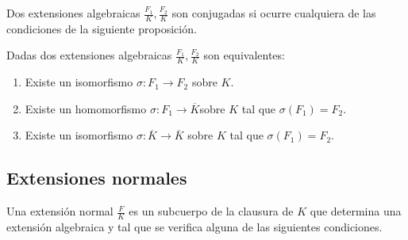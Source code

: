 \begin{definition}
Dos extensiones algebraicas $\frac{F_1}{K},\frac{F_2}{K}$ son conjugadas si ocurre cualquiera de las condiciones de la siguiente proposición. 
\end{definition}

\begin{proposition}
Dadas dos extensiones algebraicas $\frac{F_1}{K},\frac{F_2}{K}$ son equivalentes:

\begin{enumerate}
\item Existe un isomorfismo $\sigma:F_1 \to F_2$ sobre $K$. 
\item Existe un homomorfismo $\sigma:F_1 \to \overline{K}$sobre $K$ tal que $\sigma(F_1) = F_2$.
\item Existe un isomorfismo $\sigma:\overline{K} \to \overline{K}$ sobre $K$ tal que $\sigma(F_1) = F_2$. 
\end{enumerate}
\end{proposition}

\subsection{Extensiones normales}

\begin{definition}
Una extensión normal $\frac{F}{K}$ es un subcuerpo de la clausura de $K$ que determina una extensión algebraica y tal que se verifica alguna de las siguientes condiciones.
\end{definition}

